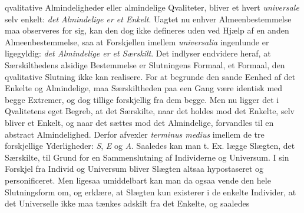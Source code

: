 \documentclass[12pt]{book}
\newcommand{\opage}[1]{\marginnote{\footnotesize\textit{[#1]}}}
\begin{document}
qvalitative Almindeligheder eller almindelige Qvaliteter, bliver et%
\opage{78}hvert \textit{universale} selv enkelt: \emph{det Almindelige er et Enkelt}. Uagtet
nu enhver Almeenbestemmelse maa observeres for sig, kan den dog ikke defineres uden
ved Hjælp af en anden Almeenbestemmelse, saa at Forskjellen imellem
\textit{universalia} ingenlunde er ligegyldig: \emph{det Almindelige er et
Særskilt}. Det indlyser endvidere heraf, at Særskilthedens alsidige Bestemmelse er
Slutningens Formaal, et Formaal, den qvalitative Slutning ikke kan realisere. For at
begrunde den sande Eenhed af det Enkelte og Almindelige, maa Særskiltheden paa een
Gang være identisk med begge Extremer, og dog tillige forskjellig fra dem begge. Men
nu ligger det i Qvalitetens eget Begreb, at det Særskilte, naar det holdes mod det
Enkelte, selv bliver et Enkelt, og naar det sættes mod det Almindelige, forvandles
til en abstract Almindelighed. Derfor afvexler \textit{terminus medius} imellem de
tre forskjellige Yderligheder: \textit{S}, \textit{E} og \textit{A}. Saaledes kan
man t. Ex. lægge Slægten, det Særskilte, til Grund for en Sammenslutning af
Individerne og Universum. I sin Forskjel fra Individ og Universum bliver Slægten
altsaa hypostaseret og personificeret. Men ligesaa umiddelbart kan man da ogsaa
vende den hele Slutningsform om, og erklære, at Slægten kun existerer i de enkelte
Individer, at det Universelle ikke maa tænkes adskilt fra det Enkelte, og saaledes
\end{document}
